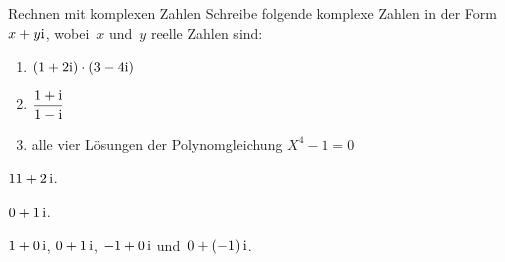 \documentclass{algblatt}
\begin{document}
\ifloesungen\newpage\fi
\begin{aufgabe}{Rechnen mit komplexen Zahlen}
Schreibe folgende komplexe Zahlen in der Form~$x + y \mathrm{i}$, wobei~$x$ und~$y$
reelle Zahlen sind:
\begin{enumerate}
\item $(1 + 2 \mathrm{i}) \cdot (3 - 4 \mathrm{i})$
\item $\dfrac{1 + \mathrm{i}}{1 - \mathrm{i}}$
\item alle vier Lösungen der Polynomgleichung $X^4 - 1 = 0$
\end{enumerate}

\begin{loesungE}
\item $11 + 2 \, \mathrm{i}$.
\item $0 + 1 \, \mathrm{i}$.
\item $1 + 0 \, \mathrm{i}$, $0 + 1 \, \mathrm{i}$, $-1 + 0 \, \mathrm{i}$ und~$0 + (-1) \, \mathrm{i}$.
\end{loesungE}
\end{aufgabe}
\end{document}
